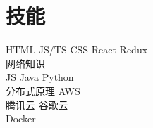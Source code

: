 \documentclass[]{deedy-resume-openfont}
\begin{document}
\begin{minipage}[t]{0.25\textwidth}



\section{技能}
\sectionsep

HTML \textbullet{}JS/TS \textbullet{} CSS \textbullet{} React \textbullet{} Redux \textbullet{}  \\
网络知识 \\
\sectionsep
{}
JS \textbullet{} Java \textbullet{} Python \\
\sectionsep
{}
分布式原理 \textbullet{} AWS \\ 腾讯云 \textbullet{} 谷歌云 \textbullet  \\ Docker

\sectionsep

%
%

\end{minipage} 
\hfill
\end{document}
